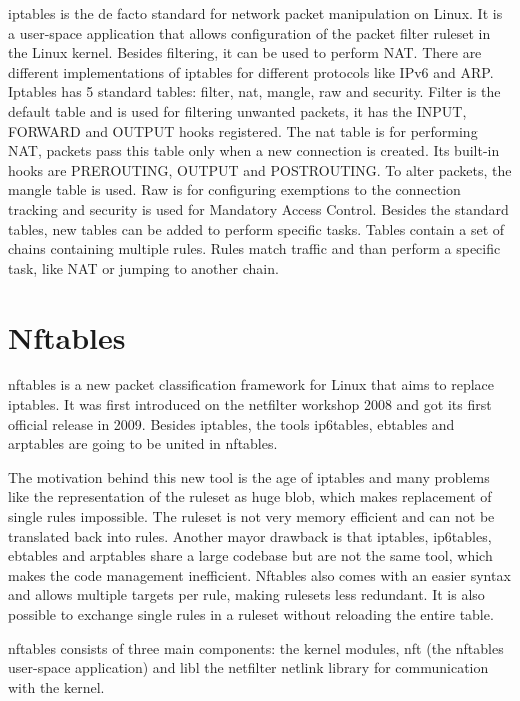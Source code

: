 \documentclass{report}
\begin{document}
iptables\cite{iptables} is the de facto standard for network packet manipulation on
Linux. It is a user-space application that allows configuration of
the packet filter ruleset in the Linux kernel. Besides filtering, it can
be used to perform NAT. There are different implementations of iptables
for different protocols like IPv6 and ARP. Iptables has 5 standard
tables: filter, nat, mangle, raw and security. Filter is the default
table and is used for filtering unwanted packets, it has the INPUT,
FORWARD and OUTPUT hooks registered. The nat table is for performing
NAT, packets pass this table only when a new connection is created. Its built-in
hooks are PREROUTING, OUTPUT and POSTROUTING. To alter
packets, the mangle table is used. Raw is for configuring exemptions to
the connection tracking and security is used for Mandatory Access
Control. Besides the standard tables, new tables can be added to perform
specific tasks. Tables contain a set of chains containing multiple rules.
Rules match traffic and than perform a specific task, like NAT or
jumping to another chain.

\section{Nftables}\label{nftables}

nftables\cite{nftables}\cite{nftables2}\cite{nftables3} is a new packet classification framework for Linux that aims to
replace iptables. It was first introduced on the netfilter workshop 2008
and got its first official release in 2009. Besides iptables, the tools
ip6tables, ebtables and arptables are going to be united in nftables.

The motivation behind this new tool is the age of iptables and many
problems like the representation of the ruleset as huge blob, which
makes replacement of single rules impossible. The ruleset is not very
memory efficient and can not be translated back into rules. Another
mayor drawback is that iptables, ip6tables, ebtables and arptables share
a large codebase but are not the same tool, which makes the code
management inefficient. Nftables also comes with an easier syntax and
allows multiple targets per rule, making rulesets less redundant. It is
also possible to exchange single rules in a ruleset without reloading
the entire table.

nftables consists of three main components: the kernel modules, nft (the
nftables user-space application) and libl the netfilter netlink library
for communication with the kernel.
\end{document}
